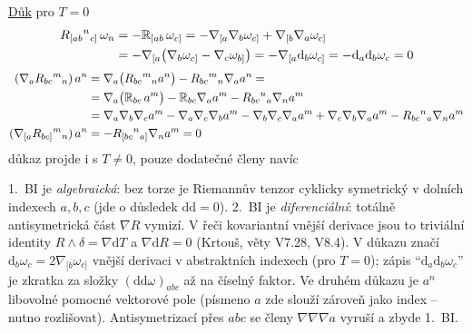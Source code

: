 \underline{Důk} pro $T = 0$
\begin{align*}
  R_{[ab}{}^{n}{}_{c]}\,\omega_n &= -\mathbb{R}_{[ab}\,\omega_{c]} = -\nabla_{[a}\nabla_b\omega_{c]} + \nabla_{[b}\nabla_a\omega_{c]} \\
  &= -\nabla_{[a}\big(\nabla_b\omega_{c]} - \nabla_c\omega_{b]}\big) = -\nabla_{[a}\mathrm{d}_b\omega_{c]} = -\mathrm{d}_a\mathrm{d}_b\omega_c = 0
\end{align*}
\begin{align*}
  (\nabla_a R_{bc}{}^{m}{}_{n})\,a^{n} &= \nabla_a\big(R_{bc}{}^{m}{}_{n}a^{n}\big) - R_{bc}{}^{m}{}_{n}\nabla_a a^{n} = \\
  &= \nabla_a\big(\mathbb{R}_{bc}\,a^{m}\big) - \mathbb{R}_{bc}\nabla_a a^{m} - R_{bc}{}^{n}{}_{a}\nabla_n a^{m} \\
  &= \nabla_a\nabla_b\nabla_c a^{m} - \nabla_a\nabla_c\nabla_b a^{m} - \nabla_b\nabla_c\nabla_a a^{m} + \nabla_c\nabla_b\nabla_a a^{m} - R_{bc}{}^{n}{}_{a}\nabla_n a^{m} \\
  (\nabla_{[a}R_{bc]}{}^{m}{}_{n})\,a^{n} &= -R_{[bc}{}^{n}{}_{a]}\nabla_n a^{m} = 0
\end{align*}
důkaz projde i s $T\neq 0$, pouze dodatečné členy navíc

\begin{vysvetleni}
1.\ BI je \emph{algebraická}: bez torze je Riemannův tenzor cyklicky symetrický v dolních indexech $a,b,c$ (jde o důsledek $\mathrm{d}\mathrm{d}=0$). 2.\ BI je \emph{diferenciální}: totálně antisymetrická část $\nabla R$ vymizí. V řeči kovariantní vnější derivace jsou to triviální identity $R\wedge\delta=\nabla\mathrm{d}T$ a $\nabla\mathrm{d}R=0$ (Krtouš, věty V7.28, V8.4).
V důkazu značí $\mathrm{d}_b\omega_c=2\nabla_{[b}\omega_{c]}$ vnější derivaci v abstraktních indexech (pro $T=0$); zápis ``$\mathrm{d}_a\mathrm{d}_b\omega_c$'' je zkratka za složky $(\mathrm{d}\mathrm{d}\omega)_{abc}$ až na číselný faktor. Ve druhém důkazu je $a^{n}$ libovolné pomocné vektorové pole (písmeno $a$ zde slouží zároveň jako index -- nutno rozlišovat). Antisymetrizací přes $abc$ se členy $\nabla\nabla\nabla a$ vyruší a zbyde 1.\ BI.
\end{vysvetleni}

